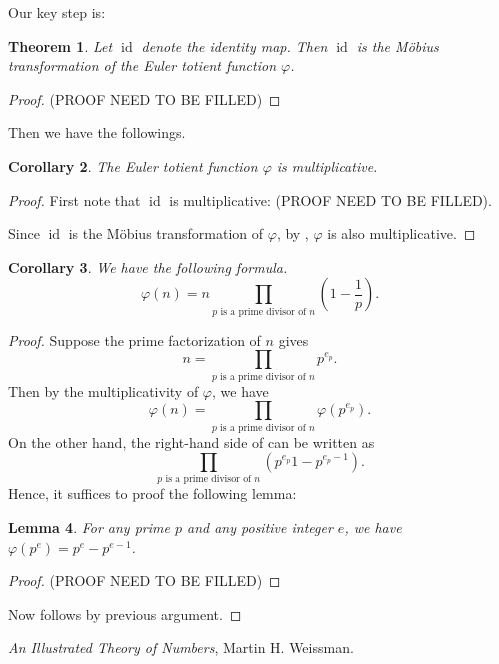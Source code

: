\documentclass[11pt]{article}
\theoremstyle{plain}
\newtheorem{theorem}{Theorem}[section]
\newtheorem{lemma}[theorem]{Lemma}
\newtheorem{corollary}[theorem]{Corollary}
\theoremstyle{definition}
\theoremstyle{remark}
\numberwithin{equation}{section}
\DeclareMathOperator{\id}{id} %
\begin{document}
Our key step is:
\begin{theorem}
	Let $\id$ denote the identity map.
	Then $\id$ is the Möbius transformation of the Euler totient function $\varphi$.
\end{theorem}
\begin{proof}
	{\color{red} (PROOF NEED TO BE FILLED)}
\end{proof}

Then we have the followings.
\begin{corollary}
	The Euler totient function $\varphi$ is multiplicative.
\end{corollary}
\begin{proof}
	First note that $\id$ is multiplicative: {\color{red} (PROOF NEED TO BE FILLED)}.

	Since $\id$ is the Möbius transformation of $\varphi$, by , $\varphi$ is also multiplicative. 
\end{proof}

\begin{corollary}
	We have the following formula.
	\begin{equation}\label{eq:totient}
		\varphi(n) = 
		n
		\prod_{\text{$p$ is a prime divisor of $n$}}
		\left(1-\frac{1}{p}\right).
	\end{equation}
\end{corollary}
\begin{proof}
	Suppose the prime factorization of $n$ gives 
	\[
		n = \prod_{\text{$p$ is a prime divisor of $n$}}p^{e_p}.
	\]
	Then by the multiplicativity of $\varphi$, we have 
	\[
		\varphi(n) = \prod_{\text{$p$ is a prime divisor of $n$}}\varphi(p^{e_p}).
	\]
	On the other hand, the right-hand side of  can be written as 
	\[
		\prod_{\text{$p$ is a prime divisor of $n$}}\left(p^{e_p}1-p^{e_p-1}\right).
	\]
	Hence, it suffices to proof the following lemma:
	\begin{lemma}
		For any prime $p$ and any positive integer $e$, we have $\varphi(p^e)=p^e-p^{e-1}$.
	\end{lemma}
	\begin{proof}
		{\color{red} (PROOF NEED TO BE FILLED)}
	\end{proof}
	Now  follows by previous argument.
\end{proof}


\begin{thebibliography}{9}  %

\emph{An Illustrated Theory of Numbers}, Martin H. Weissman. %


\end{thebibliography}  %
\end{document}

